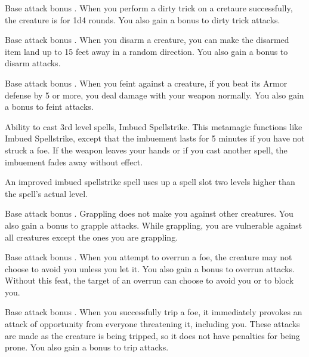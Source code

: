  Base attack bonus .
 When you perform a dirty trick on a cretaure successfully, the creature is \vulnerable for 1d4 rounds. You also gain a  bonus to dirty trick attacks.

 Base attack bonus .
 When you disarm a creature, you can make the disarmed item land up to 15 feet away in a random direction. You also gain a  bonus to disarm attacks.

 Base attack bonus .
 When you feint against a creature, if you beat its Armor defense by 5 or more, you deal damage with your weapon normally. You also gain a  bonus to feint attacks.

 Ability to cast 3rd level spells, Imbued Spellstrike.
 This metamagic functions like Imbued Spellstrike, except that the imbuement lasts for 5 minutes if you have not struck a foe. If the weapon leaves your hands or if you cast another spell, the imbuement fades away without effect.

An improved imbued spellstrike spell uses up a spell slot two levels higher than the spell's actual level.

 Base attack bonus .
 Grappling does not make you \vulnerable against other creatures. You also gain a  bonus to grapple attacks.
 While grappling, you are vulnerable against all creatures except the ones you are grappling.

 Base attack bonus .
 When you attempt to overrun a foe, the creature may not choose to avoid you unless you let it. You also gain a  bonus to overrun attacks.
 Without this feat, the target of an overrun can choose to avoid you or to block you.

 Base attack bonus .
 When you successfully trip a foe, it immediately provokes an attack of opportunity from everyone threatening it, including you. These attacks are made as the creature is being tripped, so it does not have penalties for being prone. You also gain a  bonus to trip attacks.

